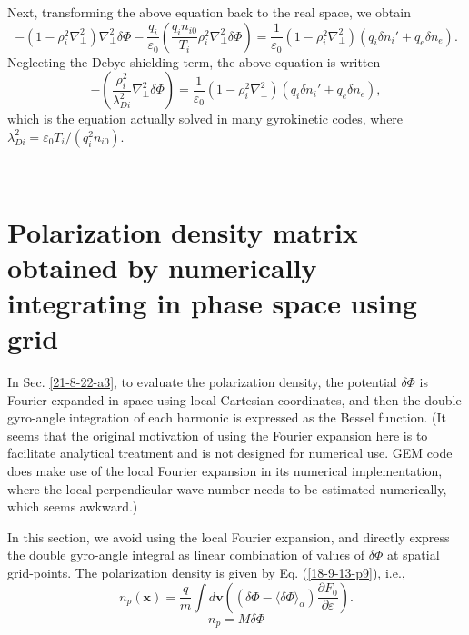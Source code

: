 \documentclass{article}
\begin{document}
Next, transforming the above equation back to the real space, we obtain
\begin{equation}
  - (1 - \rho_i^2 \nabla_{\perp}^2) \nabla_{\perp}^2 \delta \Phi -
  \frac{q_i}{\varepsilon_0} \left( \frac{q_i n_{i 0}}{T_i} \rho_i^2
  \nabla_{\perp}^2 \delta \Phi \right) = \frac{1}{\varepsilon_0} (1 - \rho_i^2
  \nabla_{\perp}^2) (q_i \delta n_i' + q_e \delta n_e) .
\end{equation}
Neglecting the Debye shielding term, the above equation is written
\begin{equation}
  - \left( \frac{\rho_i^2}{\lambda_{D i}^2} \nabla_{\perp}^2 \delta \Phi
  \right) = \frac{1}{\varepsilon_0} (1 - \rho_i^2 \nabla_{\perp}^2) (q_i
  \delta n_i' + q_e \delta n_e),
\end{equation}
which is the equation actually solved in many gyrokinetic codes, where
$\lambda_{D i}^2 = \varepsilon_0 T_i / (q_i^2 n_{i 0})$.

\

\section{Polarization density matrix obtained by numerically integrating in
phase space using grid}

In Sec. \ref{21-8-22-a3}, to evaluate the polarization density, the potential
$\delta \Phi$ is Fourier expanded in space using local Cartesian coordinates,
and then the double gyro-angle integration of each harmonic is expressed as
the Bessel function. (It seems that the original motivation of using the
Fourier expansion here is to facilitate analytical treatment and is not
designed for numerical use. GEM code does make use of the local Fourier
expansion in its numerical implementation, where the local perpendicular wave
number needs to be estimated numerically, which seems awkward.)

In this section, we avoid using the local Fourier expansion, and directly
express the double gyro-angle integral as linear combination of values of
$\delta \Phi$ at spatial grid-points. The polarization density is given by Eq.
(\ref{18-9-13-p9}), i.e.,
\begin{equation}
  n_p (\mathbf{x}) = \frac{q}{m} \int d\mathbf{v} \left( (\delta \Phi -
  \langle \delta \Phi \rangle_{\alpha}) \frac{\partial F_0}{\partial
  \varepsilon} \right) .
\end{equation}
\begin{equation}
  n_p = M \delta \Phi
\end{equation}
\end{document}
